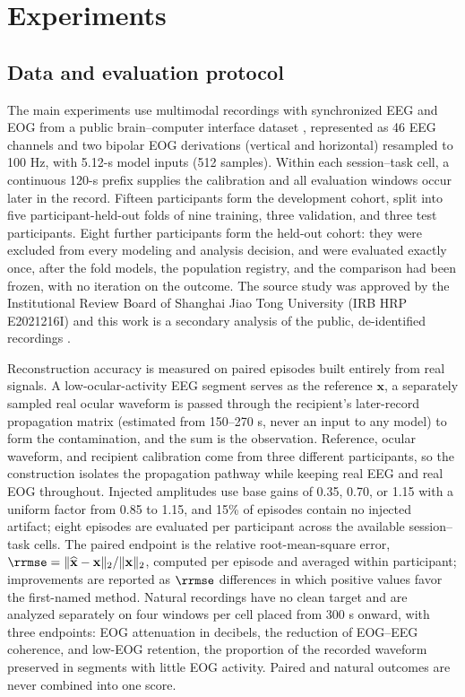 \section{Experiments}
\label{sec:experiments}

\subsection{Data and evaluation protocol}
\label{sec:exp-data}

The main experiments use multimodal recordings with synchronized EEG and EOG from a public brain--computer interface dataset \cite{guttmannflury2025ocular,guttmannflury2024eyebci}, represented as 46 EEG channels and two bipolar EOG derivations (vertical and horizontal) resampled to 100 Hz, with 5.12-s model inputs (512 samples). Within each session--task cell, a continuous 120-s prefix supplies the calibration and all evaluation windows occur later in the record. Fifteen participants form the development cohort, split into five participant-held-out folds of nine training, three validation, and three test participants. Eight further participants form the held-out cohort: they were excluded from every modeling and analysis decision, and were evaluated exactly once, after the fold models, the population registry, and the comparison had been frozen, with no iteration on the outcome. The source study was approved by the Institutional Review Board of Shanghai Jiao Tong University (IRB HRP E2021216I) and this work is a secondary analysis of the public, de-identified recordings \cite{guttmannflury2025ocular}.

Reconstruction accuracy is measured on paired episodes built entirely from real signals. A low-ocular-activity EEG segment serves as the reference $\mathbf{x}$, a separately sampled real ocular waveform is passed through the recipient's later-record propagation matrix (estimated from 150--270 s, never an input to any model) to form the contamination, and the sum is the observation. Reference, ocular waveform, and recipient calibration come from three different participants, so the construction isolates the propagation pathway while keeping real EEG and real EOG throughout. Injected amplitudes use base gains of 0.35, 0.70, or 1.15 with a uniform factor from 0.85 to 1.15, and 15\% of episodes contain no injected artifact; eight episodes are evaluated per participant across the available session--task cells. The paired endpoint is the relative root-mean-square error, $\rrmse = \lVert \widehat{\mathbf{x}} - \mathbf{x} \rVert_2 / \lVert \mathbf{x} \rVert_2$, computed per episode and averaged within participant; improvements are reported as $\rrmse$ differences in which positive values favor the first-named method. Natural recordings have no clean target and are analyzed separately on four windows per cell placed from 300 s onward, with three endpoints: EOG attenuation in decibels, the reduction of EOG--EEG coherence, and low-EOG retention, the proportion of the recorded waveform preserved in segments with little EOG activity. Paired and natural outcomes are never combined into one score.

